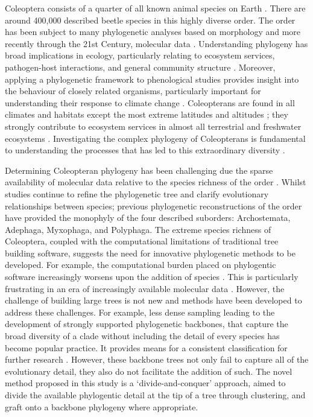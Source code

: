 \documentclass[12pt]{article}
\begin{document}
  Coleoptera consists of a quarter of all known animal species on Earth \cite{YUAN201699}. There are around 400,000 described beetle species in this highly diverse order. The order has been subject to many phylogenetic analyses based on morphology and more recently through the 21st Century, molecular data \cite{orlov}. Understanding phylogeny has broad implications in ecology, particularly relating to ecosystem services, pathogen-host interactions, and general community structure \cite{Davis2010}. Moreover, applying a phylogenetic framework to phenological studies provides insight into the behaviour of closely related organisms, particularly important for understanding their response to climate change \cite{Davis2010}. Coleopterans are found in all climates and habitats except the most extreme latitudes and altitudes \cite{brit}; they strongly contribute to ecosystem services in almost all terrestrial and freshwater ecosystems \cite{Zhang2018}. Investigating the complex phylogeny of Coleopterans is fundamental to understanding the processes that has led to this extraordinary diversity \cite{Zhang2018}.
  
  Determining Coleopteran phylogeny has been challenging due the sparse availability of molecular data relative to the species richness of the order \cite{Zhang2018}. Whilst studies continue to refine the phylogenetic tree and clarify evolutionary relationships between species; previous phylogenetic reconstructions of the order have provided the monophyly of the four described suborders: Archostemata, Adephaga, Myxophaga, and Polyphaga. The extreme species richness of Coleoptera, coupled with the computational limitations of traditional tree building software, suggests the need for innovative phylogenetic methods to be developed. For example, the computational burden placed on phylogentic software increasingly worsens upon the addition of species \cite{ahmed}. This is particularly frustrating in an era of increasingly available molecular data \cite{Sanderson2003}. However, the challenge of building large trees is not new and methods have been developed to address these challenges. For example, less dense sampling leading to the development of strongly supported phylogenetic backbones, that capture the broad diversity of a clade without including the detail of every species has become popular practice. It provides means for a consistent classification for further research \cite{Xu2022}. However, these backbone trees not only fail to capture all of the evolutionary detail, they also do not facilitate the addition of such. The novel method proposed in this study is a `divide-and-conquer' approach, aimed to divide the available phylogentic detail at the tip of a tree through clustering, and graft onto a backbone phylogeny where appropriate.
  
\end{document}
